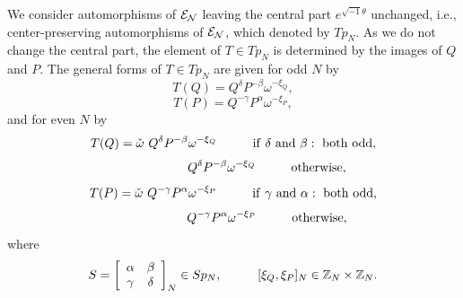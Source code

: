 \documentclass[12pt]{iopart}
\begin{document}

We consider automorphisms of \(\cal E_N\) leaving the central part \(e^{\sqrt{-1}\theta}\) unchanged,
i.e., center-preserving automorphisms of \(\cal E_N\), which denoted by \(Tp_N\).
%
%
%
%
As we do not change the central part, the element of \(T\in Tp_N\) is
determined by the images of \(Q\) and \(P\).
%
The general forms of \(T\in Tp_N\) are given for odd \(N\) by
%
\begin{equation}
T(Q)=Q^{\delta}P^{-\beta}\omega^{-\xi_Q},
\end{equation}
\begin{equation}
T(P)=Q^{-\gamma}P^{\alpha}\omega^{-\xi_P},
\end{equation}
and for even \(N\) by
\[
%
T(Q)=
\check\omega\ Q^{\delta}P^{-\beta}\omega^{-\xi_Q} \hspace{10mm} {\rm if}\ \delta\ {\rm and}\ \beta: {\rm\ both\ odd},
\]
\begin{equation}
\hspace{19mm}Q^{\delta}P^{-\beta}\omega^{-\xi_Q} \hspace{10mm} {\rm otherwise},
\end{equation}
\[
T(P)=
\check\omega\ Q^{-\gamma}P^{\alpha}\omega^{-\xi_P} \hspace{10mm} {\rm if}\ \gamma\ {\rm and}\ \alpha: {\rm\ both\ odd},
\]
\begin{equation}
\hspace{19mm}Q^{-\gamma}P^{\alpha}\omega^{-\xi_P} \hspace{10mm} {\rm otherwise},
\end{equation}
where
\begin{equation}
S=\left[\begin{array}{cc}\alpha&\beta\\\gamma&\delta\end{array}\right]_N\in Sp_N,
\hspace{10mm}
[\xi_Q,\xi_P]_N\in\mathbb Z_N\times\mathbb Z_N.
\end{equation}
\end{document}
